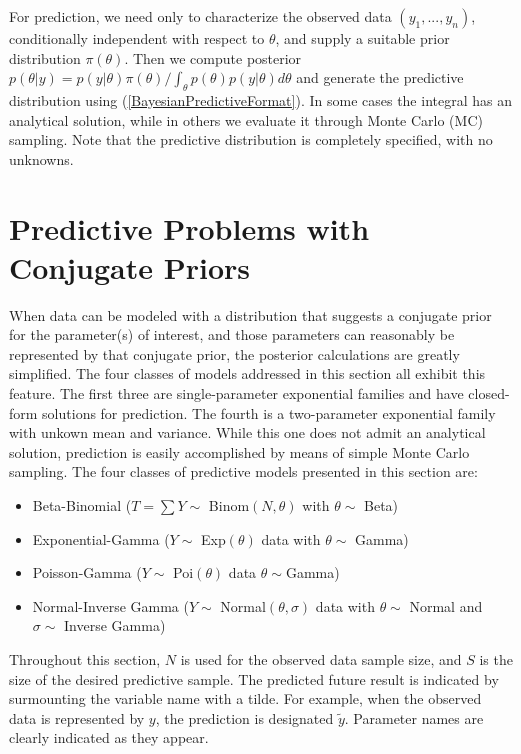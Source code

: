 \documentclass[12pt, a4paper]{article}
\begin{document}
\noindent For prediction, we need only to characterize the observed data $(y_1,...,y_n)$, conditionally independent with respect to  $\theta$, and supply a suitable prior distribution $\pi(\theta)$.  Then we compute posterior $p(\theta|y) = p(y|\theta)\pi(\theta)/\int_\theta p(\theta)p(y|\theta)d\theta$ and generate the predictive distribution using   (\ref{BayesianPredictiveFormat}).  In some cases the integral has an analytical solution, while in others we evaluate it through Monte Carlo (MC) sampling. Note that the predictive distribution is completely specified, with no unknowns.



\clearpage

\section{Predictive Problems with Conjugate Priors}

\noindent When data can be modeled with a distribution that suggests a conjugate prior for the parameter(s) of interest, and those parameters can reasonably be represented by that conjugate prior, the posterior calculations are greatly simplified.  The four classes of models addressed in this section all exhibit this feature.  The first three are single-parameter exponential families and have closed-form solutions for prediction.  The fourth is a two-parameter exponential family with unkown mean and variance.  While this one does not admit an analytical solution, prediction is easily accomplished by means of simple Monte Carlo sampling.  The four classes of predictive models presented in this section are:
\begin{itemize}
  \item Beta-Binomial ($T = \sum Y\sim$ Binom$(N,\theta)$ with $\theta\sim$ Beta)
  \item Exponential-Gamma ($Y\sim$ Exp$(\theta)$ data with $\theta\sim$ Gamma)
  \item Poisson-Gamma ($Y\sim$ Poi$(\theta)$ data $\theta\sim$Gamma)
  \item Normal-Inverse Gamma ($Y\sim$ Normal$(\theta,\sigma)$ data with $\theta\sim$ Normal and $\sigma\sim$ Inverse Gamma)
\end{itemize}

\noindent Throughout this section, $N$ is used for the observed data sample
size, and $S$ is the size of the desired predictive sample. The predicted future result
is indicated by surmounting the variable name with a tilde.  For example, when the observed data is represented by $y$, the prediction is designated $\tilde{y}$. Parameter names are clearly indicated as they appear.
\end{document}
